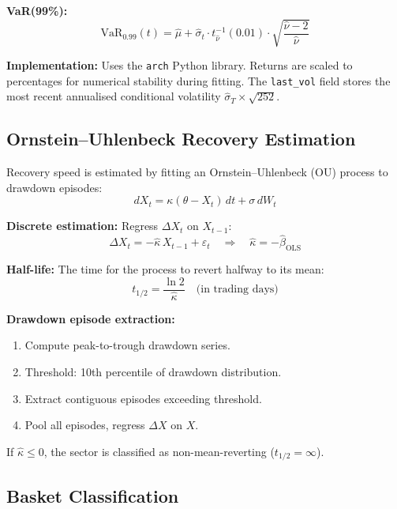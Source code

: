 \documentclass[11pt,a4paper]{article}
\begin{document}
\textbf{VaR(99\%):}
\begin{equation}
  \mathrm{VaR}_{0.99}(t) = \hat{\mu} + \hat{\sigma}_t \cdot t_{\hat{\nu}}^{-1}(0.01) \cdot \sqrt{\frac{\hat{\nu}-2}{\hat{\nu}}}
\end{equation}

\textbf{Implementation:} Uses the \texttt{arch} Python library. Returns are scaled to percentages for numerical stability during fitting. The \texttt{last\_vol} field stores the most recent annualised conditional volatility $\hat{\sigma}_T \times \sqrt{252}$.

\subsection{Ornstein--Uhlenbeck Recovery Estimation}

Recovery speed is estimated by fitting an Ornstein--Uhlenbeck (OU) process to drawdown episodes:
\begin{equation}
  dX_t = \kappa(\theta - X_t)\,dt + \sigma\,dW_t
\end{equation}

\textbf{Discrete estimation:} Regress $\Delta X_t$ on $X_{t-1}$:
\begin{equation}
  \Delta X_t = -\hat{\kappa}\,X_{t-1} + \varepsilon_t \quad \Rightarrow \quad \hat{\kappa} = -\hat{\beta}_{\mathrm{OLS}}
\end{equation}

\textbf{Half-life:} The time for the process to revert halfway to its mean:
\begin{equation}
  t_{1/2} = \frac{\ln 2}{\hat{\kappa}} \quad \text{(in trading days)}
\end{equation}

\textbf{Drawdown episode extraction:}
\begin{enumerate}[nosep]
  \item Compute peak-to-trough drawdown series.
  \item Threshold: 10th percentile of drawdown distribution.
  \item Extract contiguous episodes exceeding threshold.
  \item Pool all episodes, regress $\Delta X$ on $X$.
\end{enumerate}

If $\hat{\kappa} \le 0$, the sector is classified as non-mean-reverting ($t_{1/2} = \infty$).

\subsection{Basket Classification}
\end{document}
